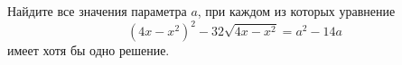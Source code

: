 \begin{ex}
	\begin{condition}
		Найдите все значения параметра \( a \), при каждом из которых уравнение \[ (4x-x^2)^2-32\sqrt{4x-x^2}=a^2-14a \] имеет хотя бы одно решение.
	\end{condition}
\end{ex}